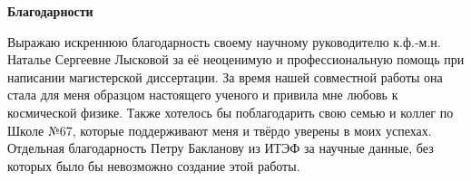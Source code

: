 \begin{center}
    \Large{\textbf{Благодарности}}
\end{center}

\noindent Выражаю искреннюю благодарность своему научному руководителю к.ф.-м.н. Наталье Сергеевне Лысковой за её неоценимую и профессиональную помощь при написании магистерской диссертации. За время нашей совместной работы она стала для меня образцом настоящего ученого и привила мне любовь к космической физике. Также хотелось бы поблагодарить свою семью и коллег по Школе №67, которые поддерживают меня и твёрдо уверены в моих успехах. Отдельная благодарность Петру Бакланову из ИТЭФ за научные данные, без которых было бы невозможно создание этой работы.
